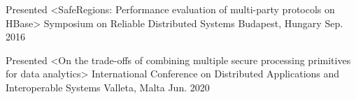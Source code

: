 

\begin{cventries}

  \cventry
    {Presented <SafeRegions: Performance evaluation of multi-party protocols on HBase>} %
    {Symposium on Reliable Distributed Systems} %
    {Budapest, Hungary} %
    {Sep. 2016} %
    {
    }

  \cventry
    {Presented <On the trade-offs of combining multiple secure processing primitives for data analytics>} %
    {International Conference on Distributed Applications and Interoperable Systems} %
    {Valleta, Malta} %
    {Jun. 2020} %
    {
    }
\end{cventries}
